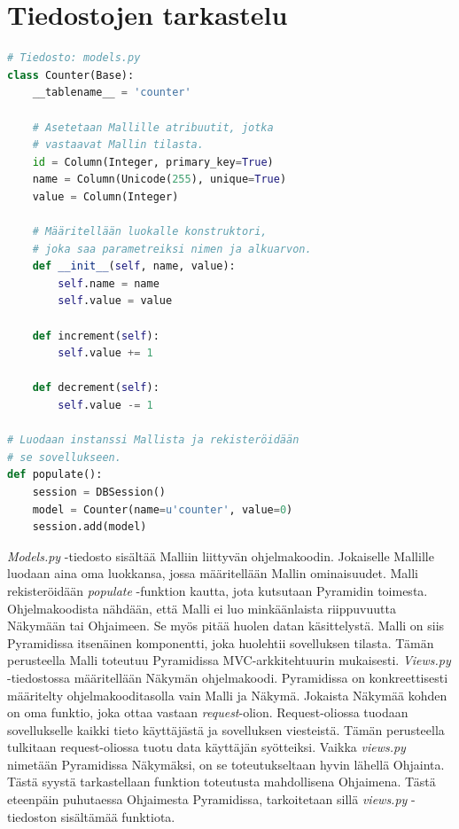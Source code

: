 \documentclass[utf8]{gradu3}
\begin{document}
\section{Tiedostojen tarkastelu}
\lstset{numbers=left}
\begin{lstlisting}[language=Python]
# Tiedosto: models.py
class Counter(Base):
    __tablename__ = 'counter'

    # Asetetaan Mallille atribuutit, jotka
    # vastaavat Mallin tilasta.
    id = Column(Integer, primary_key=True)
    name = Column(Unicode(255), unique=True)
    value = Column(Integer)

    # Määritellään luokalle konstruktori,
    # joka saa parametreiksi nimen ja alkuarvon.
    def __init__(self, name, value):
        self.name = name
        self.value = value

    def increment(self):
        self.value += 1

    def decrement(self):
        self.value -= 1

# Luodaan instanssi Mallista ja rekisteröidään 
# se sovellukseen.
def populate():
    session = DBSession()
    model = Counter(name=u'counter', value=0)
    session.add(model)
\end{lstlisting}
\emph{Models.py} -tiedosto sisältää Malliin liittyvän ohjelmakoodin. Jokaiselle Mallille luodaan aina oma luokkansa, jossa määritellään Mallin ominaisuudet. Malli rekisteröidään \emph{populate} -funktion kautta, jota kutsutaan Pyramidin toimesta.
Ohjelmakoodista nähdään, että Malli ei luo minkäänlaista riippuvuutta Näkymään tai Ohjaimeen. Se myös pitää huolen datan käsittelystä.  Malli on siis Pyramidissa itsenäinen komponentti, joka huolehtii sovelluksen tilasta. Tämän perusteella Malli toteutuu Pyramidissa MVC-arkkitehtuurin mukaisesti.
\emph{Views.py} -tiedostossa määritellään Näkymän ohjelmakoodi. Pyramidissa on konkreettisesti määritelty ohjelmakooditasolla vain Malli ja Näkymä.
Jokaista Näkymää kohden on oma funktio, joka ottaa vastaan \emph{request}-olion. Request-oliossa tuodaan sovellukselle kaikki tieto käyttäjästä ja sovelluksen viesteistä. Tämän perusteella tulkitaan request-oliossa tuotu data käyttäjän syötteiksi.
Vaikka \emph{views.py} nimetään Pyramidissa Näkymäksi, on se toteutukseltaan hyvin lähellä Ohjainta. Tästä syystä tarkastellaan funktion toteutusta mahdollisena Ohjaimena. Tästä eteenpäin puhutaessa Ohjaimesta Pyramidissa, tarkoitetaan sillä \emph{views.py} -tiedoston sisältämää funktiota.
\end{document}
